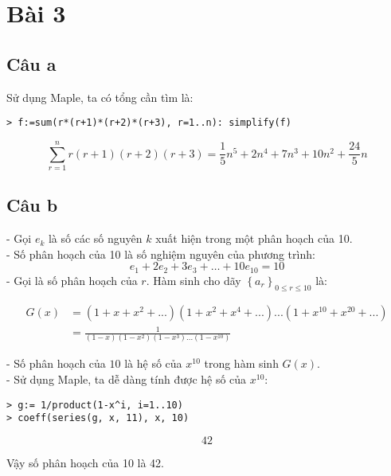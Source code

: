 \documentclass[main.tex]{subfiles}
\begin{document}
\section{Bài 3}
\subsection{Câu a}
Sử dụng Maple, ta có tổng cần tìm là:
\begin{verbatim}
> f:=sum(r*(r+1)*(r+2)*(r+3), r=1..n): simplify(f)
\end{verbatim}
$$
\sum^{n}_{r=1}{r(r+1)(r+2)(r+3)}=
\frac{1}{5}n^5 + 2n^4 + 7n^3 + 10n^2 + \frac{24}{5}n
$$

\subsection{Câu b}
- Gọi $e_k$ là số các số nguyên $k$ xuất hiện trong một phân hoạch của 10.\\
- Số phân hoạch của 10 là số nghiệm nguyên của phương trình:
$$
e_1 + 2e_2 + 3e_3 + \dots + 10e_{10} = 10
$$
- Gọi  là số phân hoạch của $r$. Hàm sinh cho dãy $\left\{a_r\right\}_{0\le r \le 10}$ là:

\begin{align*}
G(x) &= (1+x+x^2+...)(1+x^2+x^4+...)...(1+x^{10}+x^{20}+...)\\
&= \frac{1}{(1-x)(1-x^2)(1-x^3)...(1-x^{10})}
\end{align*}

- Số phân hoạch của $10$ là hệ số của $x^{10}$ trong hàm sinh $G(x)$.\\
- Sử dụng Maple, ta dễ dàng tính được hệ số của $x^{10}$:
\begin{verbatim}
> g:= 1/product(1-x^i, i=1..10)
> coeff(series(g, x, 11), x, 10)
\end{verbatim}
$$
42
$$

Vậy số phân hoạch của 10 là 42.
\end{document}
